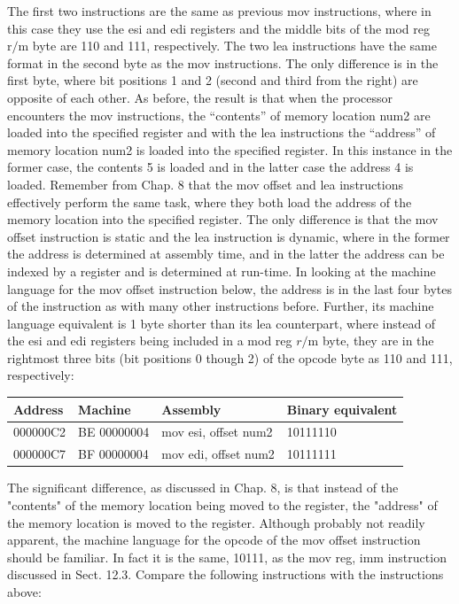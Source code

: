 \documentclass[10pt]{book}
\begin{document}
The first two instructions are the same as previous mov instructions, where in this case they use the esi and edi registers and the middle bits of the mod reg $\mathrm{r} / \mathrm{m}$ byte are 110 and 111, respectively. The two lea instructions have the same format in the second byte as the mov instructions. The only difference is in the first byte, where bit positions 1 and 2 (second and third from the right) are opposite of each other. As before, the result is that when the processor encounters the mov instructions, the ``contents'' of memory location num2 are loaded into the specified register and with the lea instructions the ``address'' of memory location num2 is loaded into the specified register. In this instance in the former case, the contents 5 is loaded and in the latter case the address 4 is loaded.
Remember from Chap. 8 that the mov offset and lea instructions effectively perform the same task, where they both load the address of the memory location into the specified register. The only difference is that the mov offset instruction is static and the lea instruction is dynamic, where in the former the address is determined at assembly time, and in the latter the address can be indexed by a register and is determined at run-time. In looking at the machine language for the mov offset instruction below, the address is in the last four bytes of the instruction as with many other instructions before. Further, its machine language equivalent is 1 byte shorter than its lea counterpart, where instead of the esi and edi registers being included in a mod reg $r / \mathrm{m}$ byte, they are in the rightmost three bits (bit positions 0 though 2) of the opcode byte as 110 and 111, respectively:

\begin{center}
\begin{tabular}{|l|l|l|l|}
\hline
Address & Machine & Assembly & Binary equivalent \\
\hline
000000C2 & BE 00000004 & mov esi, offset num2 & 10111110 \\
\hline
000000C7 & BF 00000004 & mov edi, offset num2 & 10111111 \\
\hline
\end{tabular}
\end{center}

The significant difference, as discussed in Chap. 8, is that instead of the "contents" of the memory location being moved to the register, the "address" of the memory location is moved to the register. Although probably not readily apparent, the machine language for the opcode of the mov offset instruction should be familiar. In fact it is the same, 10111, as the mov reg, imm instruction discussed in Sect. 12.3. Compare the following instructions with the instructions above:
\end{document}

